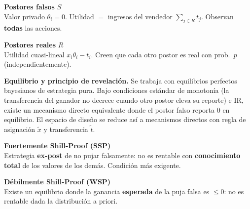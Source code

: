 \documentclass[20pt]{extarticle}
\renewcommand{\small}{\fontsize{20}{25}\selectfont}
\renewcommand{\footnotesize}{\fontsize{18}{22}\selectfont}
\begin{document}
\begin{minipage}[t]{47cm}
  \vspace{5mm}
  \noindent
  \begin{minipage}[t]{0.47\linewidth}
    \begin{tcolorbox}[rbar]
      {\small\textbf{Postores falsos} $S$}\\[4pt]
      {\footnotesize Valor privado $\theta_i=0$. Utilidad $= $ ingresos del vendedor $\sum_{j\in R}t_j$. Observan \textbf{todas} las acciones.}
    \end{tcolorbox}
  \end{minipage}\hfill
  \begin{minipage}[t]{0.47\linewidth}
    \begin{tcolorbox}[bbar]
      {\small\textbf{Postores reales} $R$}\\[4pt]
      {\footnotesize Utilidad cuasi-lineal $x_i\theta_i - t_i$. Creen que cada otro postor es real con prob.\ $p$ (independientemente).}
    \end{tcolorbox}
  \end{minipage}

  \vspace{8mm}
  {\footnotesize\justifying \textbf{Equilibrio y principio de revelación.} Se trabaja con equilibrios perfectos bayesianos de estrategia pura. Bajo condiciones estándar de monotonía (la transferencia del ganador no decrece cuando otro postor eleva su reporte) e IR, existe un mecanismo directo equivalente donde el postor falso reporta 0 en equilibrio. El espacio de diseño se reduce así a mecanismos directos con regla de asignación $\tilde x$ y transferencia $\tilde t$.}

  \vspace{8mm}
  \noindent
  \begin{minipage}[t]{0.47\linewidth}
    \begin{tcolorbox}[rbar]
      {\small\textbf{Fuertemente Shill-Proof (SSP)}}\\[6pt]
      {\footnotesize Estrategia \textbf{ex-post} de no pujar falsamente: no es rentable con \textbf{conocimiento total} de los valores de los demás. Condición más exigente.}
    \end{tcolorbox}
  \end{minipage}\hfill
  \begin{minipage}[t]{0.47\linewidth}
    \begin{tcolorbox}[bbar]
      {\small\textbf{Débilmente Shill-Proof (WSP)}}\\[6pt]
      {\footnotesize Existe un equilibrio donde la ganancia \textbf{esperada} de la puja falsa es $\leq 0$: no es rentable dada la distribución a priori.}
    \end{tcolorbox}
  \end{minipage}


\end{minipage}
\end{document}
